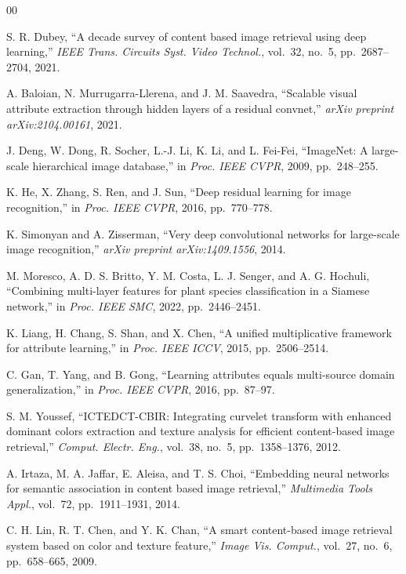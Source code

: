\documentclass[conference]{IEEEtran}
\begin{document}
\begin{thebibliography}{00}

S. R. Dubey, ``A decade survey of content based image retrieval using deep
learning,'' \emph{IEEE Trans. Circuits Syst. Video Technol.}, vol.~32,
no.~5, pp.~2687--2704, 2021.

A. Baloian, N. Murrugarra-Llerena, and J. M. Saavedra, ``Scalable visual
attribute extraction through hidden layers of a residual convnet,''
\emph{arXiv preprint arXiv:2104.00161}, 2021.

J. Deng, W. Dong, R. Socher, L.-J. Li, K. Li, and L. Fei-Fei,
``ImageNet: A large-scale hierarchical image database,'' in
\emph{Proc. IEEE CVPR}, 2009, pp.~248--255.

K. He, X. Zhang, S. Ren, and J. Sun, ``Deep residual learning for image
recognition,'' in \emph{Proc. IEEE CVPR}, 2016, pp.~770--778.

K. Simonyan and A. Zisserman, ``Very deep convolutional networks for
large-scale image recognition,'' \emph{arXiv preprint arXiv:1409.1556},
2014.

M. Moresco, A. D. S. Britto, Y. M. Costa, L. J. Senger, and
A. G. Hochuli, ``Combining multi-layer features for plant species
classification in a Siamese network,'' in \emph{Proc. IEEE SMC}, 2022,
pp.~2446--2451.

K. Liang, H. Chang, S. Shan, and X. Chen, ``A unified multiplicative
framework for attribute learning,'' in \emph{Proc. IEEE ICCV}, 2015,
pp.~2506--2514.

C. Gan, T. Yang, and B. Gong, ``Learning attributes equals multi-source
domain generalization,'' in \emph{Proc. IEEE CVPR}, 2016, pp.~87--97.

S. M. Youssef, ``ICTEDCT-CBIR: Integrating curvelet transform with
enhanced dominant colors extraction and texture analysis for efficient
content-based image retrieval,'' \emph{Comput. Electr. Eng.}, vol.~38,
no.~5, pp.~1358--1376, 2012.

A. Irtaza, M. A. Jaffar, E. Aleisa, and T. S. Choi, ``Embedding neural
networks for semantic association in content based image retrieval,''
\emph{Multimedia Tools Appl.}, vol.~72, pp.~1911--1931, 2014.

C. H. Lin, R. T. Chen, and Y. K. Chan, ``A smart content-based image
retrieval system based on color and texture feature,'' \emph{Image Vis.
Comput.}, vol.~27, no.~6, pp.~658--665, 2009.


\end{thebibliography}
\end{document}

